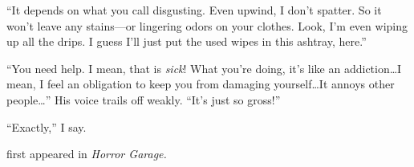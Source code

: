 ``It depends on what you call disgusting. Even upwind, I don't spatter.
So it won't leave any stains---or lingering odors on your clothes. Look,
I'm even wiping up all the drips. I guess I'll just put the used wipes
in this ashtray, here.''

``You need help. I mean, that is \emph{sick}! What you're doing, it's
like an addiction\ldots I mean, I feel an obligation to keep you from
damaging yourself\ldots It annoys other people\ldots'' His voice trails off
weakly. ``It's just so gross!''

``Exactly,'' I say.

first appeared in \emph{Horror Garage.}
